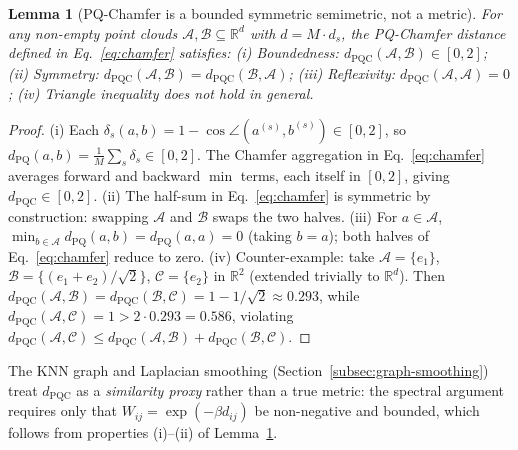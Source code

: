 \documentclass[review,1p]{elsarticle}
\newtheorem{lemma}{Lemma}
\begin{document}
\begin{lemma}[PQ-Chamfer is a bounded symmetric semimetric, not a metric]
\label{lem:pq-chamfer-semimetric}
For any non-empty point clouds $\mathcal{A}, \mathcal{B} \subseteq \mathbb{R}^{d}$ with $d = M \cdot d_s$, the PQ-Chamfer distance defined in Eq.~\eqref{eq:chamfer} satisfies:
\textup{(i) Boundedness:} $d_{\mathrm{PQC}}(\mathcal{A}, \mathcal{B}) \in [0, 2]$;
\textup{(ii) Symmetry:} $d_{\mathrm{PQC}}(\mathcal{A}, \mathcal{B}) = d_{\mathrm{PQC}}(\mathcal{B}, \mathcal{A})$;
\textup{(iii) Reflexivity:} $d_{\mathrm{PQC}}(\mathcal{A}, \mathcal{A}) = 0$;
\textup{(iv) Triangle inequality does \emph{not} hold in general.}
\end{lemma}
\begin{proof}
(i) Each $\delta_s(a,b) = 1 - \cos\angle(a^{(s)}, b^{(s)}) \in [0, 2]$, so $d_{\mathrm{PQ}}(a,b) = \tfrac{1}{M}\sum_s \delta_s \in [0, 2]$. The Chamfer aggregation in Eq.~\eqref{eq:chamfer} averages forward and backward $\min$ terms, each itself in $[0, 2]$, giving $d_{\mathrm{PQC}} \in [0, 2]$.
(ii) The half-sum in Eq.~\eqref{eq:chamfer} is symmetric by construction: swapping $\mathcal{A}$ and $\mathcal{B}$ swaps the two halves.
(iii) For $a \in \mathcal{A}$, $\min_{b \in \mathcal{A}} d_{\mathrm{PQ}}(a, b) = d_{\mathrm{PQ}}(a, a) = 0$ (taking $b = a$); both halves of Eq.~\eqref{eq:chamfer} reduce to zero.
(iv) Counter-example: take $\mathcal{A} = \{e_1\}$, $\mathcal{B} = \{(e_1 + e_2)/\sqrt{2}\}$, $\mathcal{C} = \{e_2\}$ in $\mathbb{R}^2$ (extended trivially to $\mathbb{R}^{d}$). Then $d_{\mathrm{PQC}}(\mathcal{A},\mathcal{B}) = d_{\mathrm{PQC}}(\mathcal{B},\mathcal{C}) = 1 - 1/\sqrt{2} \approx 0.293$, while $d_{\mathrm{PQC}}(\mathcal{A},\mathcal{C}) = 1 > 2 \cdot 0.293 = 0.586$, violating $d_{\mathrm{PQC}}(\mathcal{A},\mathcal{C}) \le d_{\mathrm{PQC}}(\mathcal{A},\mathcal{B}) + d_{\mathrm{PQC}}(\mathcal{B},\mathcal{C})$.
\end{proof}

\noindent The KNN graph and Laplacian smoothing (Section~\ref{subsec:graph-smoothing}) treat $d_{\mathrm{PQC}}$ as a \emph{similarity proxy} rather than a true metric: the spectral argument requires only that $W_{ij} = \exp(-\beta d_{ij})$ be non-negative and bounded, which follows from properties (i)--(ii) of Lemma~\ref{lem:pq-chamfer-semimetric}.
\end{document}
